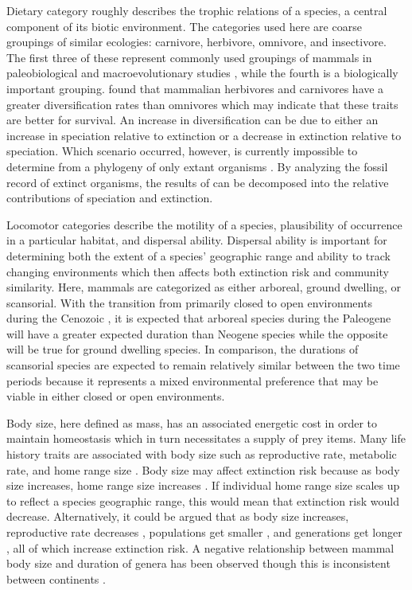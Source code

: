 \documentclass[12pt,letterpaper]{article}
\begin{document}
Dietary category roughly describes the trophic relations of a species, a central component of its biotic environment. The categories used here are coarse groupings of similar ecologies: carnivore, herbivore, omnivore, and insectivore. The first three of these represent commonly used groupings of mammals in paleobiological and macroevolutionary studies \citep{Jernvall2004,Price2012}, while the fourth is a biologically important grouping. \citet{Price2012} found that mammalian herbivores and carnivores have a greater diversification rates than omnivores which may indicate that these traits are better for survival. An increase in diversification can be due to either an increase in speciation relative to extinction or a decrease in extinction relative to speciation. Which scenario occurred, however, is currently impossible to determine from a phylogeny of only extant organisms \citep{Rabosky2010a}. By analyzing the fossil record of extinct organisms, the results of \citet{Price2012} can be decomposed into the relative contributions of speciation and extinction.

Locomotor categories describe the motility of a species, plausibility of occurrence in a particular habitat, and dispersal ability. Dispersal ability is important for determining both the extent of a species' geographic range and ability to track changing environments \citep{Birand2012,Jablonski2006a,Gaston2009} which then affects both extinction risk and community similarity. Here, mammals are categorized as either arboreal, ground dwelling, or scansorial. With the transition from primarily closed to open environments during the Cenozoic \citep{Blois2009,Janis1993a,Stromberg2005,Stromberg2013}, it is expected that arboreal species during the Paleogene will have a greater expected duration than Neogene species while the opposite will be true for ground dwelling species. In comparison, the durations of scansorial species are expected to remain relatively similar between the two time periods because it represents a mixed environmental preference that may be viable in either closed or open environments. 

Body size, here defined as mass, has an associated energetic cost in order to maintain homeostasis which in turn necessitates a supply of prey items. Many life history traits are associated with body size such as reproductive rate, metabolic rate, and home range size \cite{Peters1983a,Damuth1979,Brown1987,Smith2004}. Body size may affect extinction risk because as body size increases, home range size increases \citep{Damuth1979}. If individual home range size scales up to reflect a species geographic range, this would mean that extinction risk would decrease. Alternatively, it could be argued that as body size increases, reproductive rate decreases \citep{Johnson2002b}, populations get smaller \citep{White2007}, and generations get longer \citep{Martin1993a}, all of which increase extinction risk. A negative relationship between mammal body size and duration of genera has been observed \citep{Liow2008,Davidson2012} though this is inconsistent between continents \citep{Tomiya2013,Liow2008}. 
\end{document}
